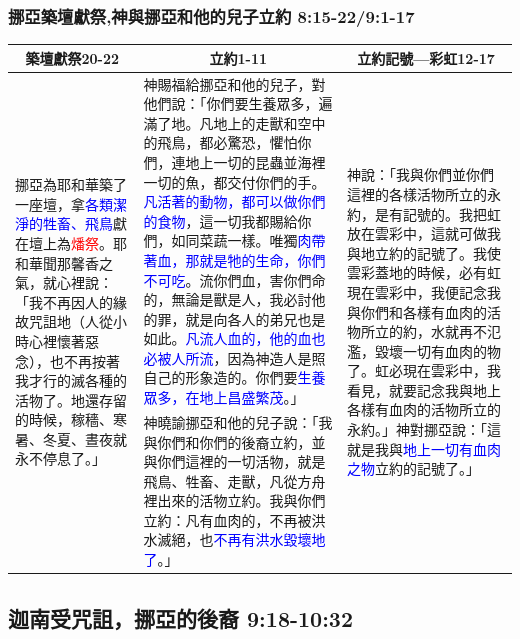 \subsubsection{挪亞築壇獻祭,神與挪亞和他的兒子立約 8:15-22/9:1-17}
\begin{table}[H]
\centering
\begin{tabular}{p{}|p{8.50cm}|p{4.8cm}}\hline\hline
\multicolumn{1}{c|}{築壇獻祭20-22}&\multicolumn{1}{c|}{立約1-11}&\multicolumn{1}{c}{立約記號—彩虹12-17}\\\hline
\multirow{2}{3.3cm}{挪亞為耶和華築了一座壇，拿\textcolor{blue}{各類潔淨的牲畜、飛鳥}獻在壇上為\textcolor{red}{燔祭}。耶和華聞那馨香之氣，就心裡說：「我不再因人的緣故咒詛地（人從小時心裡懷著惡念），也不再按著我才行的滅各種的活物了。地還存留的時候，稼穡、寒暑、冬夏、晝夜就永不停息了。」}
&神賜福給挪亞和他的兒子，對他們說：「你們要生養眾多，遍滿了地。凡地上的走獸和空中的飛鳥，都必驚恐，懼怕你們，連地上一切的昆蟲並海裡一切的魚，都交付你們的手。\textcolor{blue}{凡活著的動物，都可以做你們的食物}，這一切我都賜給你們，如同菜蔬一樣。唯獨\textcolor{blue}{肉帶著血，那就是牠的生命，你們不可吃}。流你們血，害你們命的，無論是獸是人，我必討他的罪，就是向各人的弟兄也是如此。\textcolor{blue}{凡流人血的，他的血也必被人所流}，因為神造人是照自己的形象造的。你們要\textcolor{blue}{生養眾多，在地上昌盛繁茂}。」
&\multirow{2}{5cm}{神說：「我與你們並你們這裡的各樣活物所立的永約，是有記號的。我把虹放在雲彩中，這就可做我與地立約的記號了。我使雲彩蓋地的時候，必有虹現在雲彩中，我便記念我與你們和各樣有血肉的活物所立的約，水就再不氾濫，毀壞一切有血肉的物了。虹必現在雲彩中，我看見，就要記念我與地上各樣有血肉的活物所立的永約。」神對挪亞說：「這就是我與\textcolor{blue}{地上一切有血肉之物}立約的記號了。」}\\\cline{2-2}

&神曉諭挪亞和他的兒子說：「我與你們和你們的後裔立約，並與你們這裡的一切活物，就是飛鳥、牲畜、走獸，凡從方舟裡出來的活物立約。我與你們立約：凡有血肉的，不再被洪水滅絕，也\textcolor{blue}{不再有洪水毀壞地了}。」&\\\hline
\end{tabular}
\end{table}


\subsection{迦南受咒詛，挪亞的後裔 9:18-10:32}
